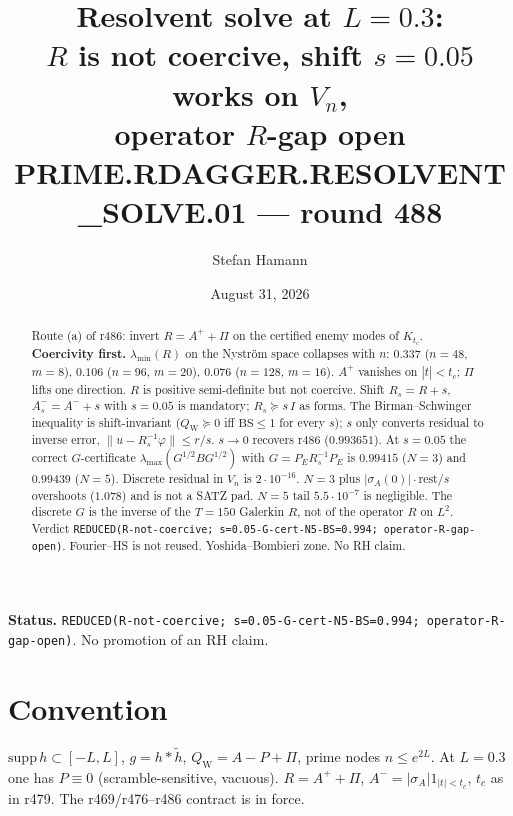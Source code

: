 \documentclass[11pt]{article}
\title{\bfseries Resolvent solve at $L=0.3$:\\[2mm]
$R$ is not coercive, shift $s=0.05$ works on $V_n$,\\[1mm]
operator $R$-gap open\\[2mm]
\large PRIME.RDAGGER.RESOLVENT\_SOLVE.01 --- round 488}
\author{Stefan Hamann}
\date{August 31, 2026}
\theoremstyle{remark}
\newcommand{\QW}{Q_{\mathrm W}}
\begin{document}
\maketitle

\begin{abstract}\noindent
Route (a) of r486: invert $R=A^++\Pi$ on the
certified enemy modes of $K_{t_c}$.
\textbf{Coercivity first.}
$\lambda_{\min}(R)$ on the Nystr\"om space collapses
with $n$: $0.337$ ($n=48$, $m=8$),
$0.106$ ($n=96$, $m=20$),
$0.076$ ($n=128$, $m=16$).
$A^+$ vanishes on $|t|<t_c$; $\Pi$ lifts one
direction.  $R$ is positive semi-definite but not
coercive.  Shift $R_s=R+s$, $A^-_s=A^-+s$ with
$s=0.05$ is mandatory; $R_s\succeq s\,I$ as forms.
The Birman--Schwinger inequality is
shift-invariant ($\QW\succeq0$ iff $\mathrm{BS}\le1$
for every $s$); $s$ only converts residual to
inverse error, $\|u-R_s^{-1}\varphi\|\le r/s$.
$s\to0$ recovers r486 ($0.993651$).
At $s=0.05$ the correct $G$-certificate
$\lambda_{\max}(G^{1/2}BG^{1/2})$
with $G=P_ER_s^{-1}P_E$ is
$0.99415$ ($N=3$) and $0.99439$ ($N=5$).
Discrete residual in $V_n$ is $2\cdot10^{-16}$.
$N=3$ plus $|\sigma_A(0)|\cdot\mathrm{rest}/s$
overshoots ($1.078$) and is not a SATZ pad.
$N=5$ tail $5.5\cdot10^{-7}$ is negligible.
The discrete $G$ is the inverse of the $T=150$
Galerkin $R$, not of the operator $R$ on $L^2$.
Verdict
\texttt{REDUCED(R-not-coercive; s=0.05-G-cert-N5-BS=0.994; operator-R-gap-open)}.
Fourier--HS is not reused.
Yoshida--Bombieri zone.  No RH claim.
\end{abstract}

\medskip\noindent
\textbf{Status.}\enspace
\texttt{REDUCED(R-not-coercive; s=0.05-G-cert-N5-BS=0.994; operator-R-gap-open)}.
No promotion of an RH claim.

\begin{center}
\end{center}

\section{Convention}

$\mathrm{supp}\,h\subset[-L,L]$, $g=h*\widetilde h$,
$\QW=A-P+\Pi$, prime nodes $n\le e^{2L}$.
At $L=0.3$ one has $P\equiv0$ (scramble-sensitive,
vacuous).
$R=A^++\Pi$, $A^-=|\sigma_A|1_{|t|<t_c}$,
$t_c$ as in r479.
The r469/r476--r486 contract is in force.
\end{document}
